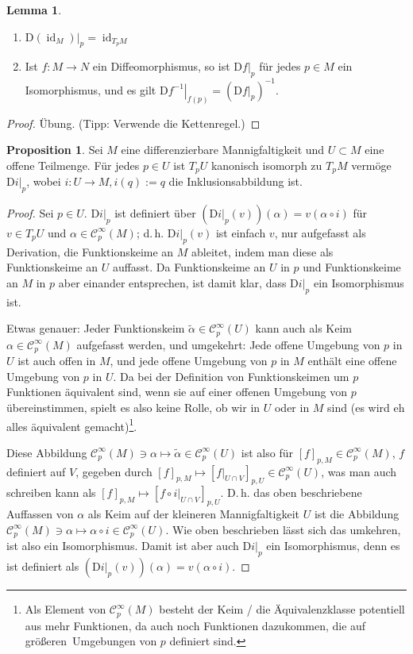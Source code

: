 \documentclass[a4paper]{scrbook}
\numberwithin{equation}{chapter}
\newcommand{\DD}{\mathrm{D}}
\DeclareMathOperator{\id}{id}
\newcommand{\sC}{\mathcal{C}^{\infty}}
\theoremstyle{definition}
\newtheorem{lemma}[defn]{Lemma}
\newtheorem{prop}[defn]{Proposition}
\begin{document}
\begin{lemma} \label{lemma:differential_diffeo}
	\begin{enumerate}[label=(\alph*)]
		\item $\left.\DD(\id_M)\right|_p = \id_{T_pM}$
		\item Ist $f\colon M \to N$ ein Diffeomorphismus, so ist $\left.\DD f\right|_p$ für jedes $p\in M$ ein Isomorphismus, und es gilt $\left.\DD f^{-1}\right|_{f(p)} = \left(\left.\DD f\right|_p\right)^{-1}$.
	\end{enumerate}

	\begin{proof}
		Übung. (Tipp: Verwende die Kettenregel.)
	\end{proof}
\end{lemma}

\begin{prop}
	Sei $M$ eine differenzierbare Mannigfaltigkeit und $U\subset M$ eine offene Teilmenge. Für jedes $p\in U$ ist $T_pU$ kanonisch isomorph zu $T_pM$ vermöge $\left.\DD i\right|_p$, wobei $i\colon U \to M, i(q) := q$ die Inklusionsabbildung ist.

	\begin{proof}
		Sei $p \in U$. $\left.\DD i\right|_p$ ist definiert über $\left(\left.\DD i\right|_p(v)\right)(\alpha) = v(\alpha\circ i)$ für $v \in T_pU$ und $\alpha \in \sC_p(M)$; d.\,h. $\left.\DD i\right|_p(v)$ ist einfach $v$, nur aufgefasst als Derivation, die Funktionskeime an $M$ ableitet, indem man diese als Funktionskeime an $U$ auffasst. Da Funktionskeime an $U$ in $p$ und Funktionskeime an $M$ in $p$ aber einander entsprechen, ist damit klar, dass $\left.\DD i\right|_p$ ein Isomorphismus ist.

		Etwas genauer: Jeder Funktionskeim $\tilde\alpha \in \sC_p(U)$ kann auch als Keim $\alpha \in \sC_p(M)$ aufgefasst werden, und umgekehrt: Jede offene Umgebung von $p$ in $U$ ist auch offen in $M$, und jede offene Umgebung von $p$ in $M$ enthält eine offene Umgebung von $p$ in $U$. Da bei der Definition von Funktionskeimen um $p$ Funktionen äquivalent sind, wenn sie auf einer offenen Umgebung von $p$ übereinstimmen, spielt es also keine Rolle, ob wir in $U$ oder in $M$ sind (\glqq es wird eh alles äquivalent gemacht\grqq)\footnote{
			Als Element von $\sC_p(M)$ besteht der Keim / die Äquivalenzklasse potentiell aus mehr Funktionen, da auch noch Funktionen dazukommen, die auf \glqq größeren\grqq\ Umgebungen von $p$ definiert sind.
		}.

		Diese Abbildung $\sC_p(M) \ni \alpha \mapsto \tilde\alpha \in \sC_p(U)$ ist also für $[f]_{p,M} \in \sC_p(M)$, $f$ definiert auf $V$, gegeben durch $[f]_{p,M} \mapsto \left[\left.f\right|_{U\cap V}\right]_{p,U} \in \sC_p(U)$, was man auch schreiben kann als $[f]_{p,M} \mapsto \left[\left.f\circ i\right|_{U\cap V}\right]_{p,U}$. D.\,h. das oben beschriebene Auffassen von $\alpha$ als Keim auf der kleineren Mannigfaltigkeit $U$ ist die Abbildung $\sC_p(M) \ni \alpha \mapsto \alpha\circ i \in \sC_p(U)$. Wie oben beschrieben lässt sich das umkehren, ist also ein Isomorphismus. Damit ist aber auch $\left.\DD i\right|_p$ ein Isomorphismus, denn es ist definiert als $\left(\left.\DD i\right|_p(v)\right)(\alpha) = v(\alpha\circ i)$.
	\end{proof}
\end{prop}
\end{document}
